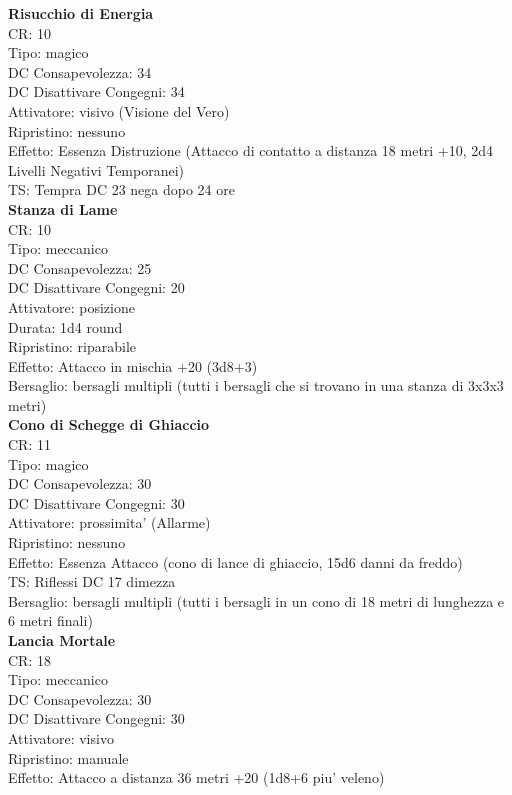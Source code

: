 \documentclass[a4paper,11pt,twoside,openany]{book}
\begin{document}
\begin{multicols}{2}
\textbf{Risucchio di Energia}\\
CR: 10 \\
Tipo: magico \\
DC Consapevolezza: 34 \\
DC Disattivare Congegni: 34 \\
Attivatore: visivo (Visione del Vero) \\
Ripristino: nessuno \\
Effetto: Essenza Distruzione (Attacco di contatto a distanza 18 metri +10, 2d4 Livelli Negativi Temporanei) \\
TS: Tempra DC 23 nega dopo 24 ore\\

\textbf{Stanza di Lame}\\
CR: 10 \\
Tipo: meccanico \\
DC Consapevolezza: 25 \\
DC Disattivare Congegni: 20 \\
Attivatore: posizione \\
Durata: 1d4 round \\
Ripristino: riparabile \\
Effetto: Attacco in mischia +20 (3d8+3) \\
Bersaglio: bersagli multipli (tutti i bersagli che si trovano in una stanza di 3x3x3 metri)\\

\textbf{Cono di Schegge di Ghiaccio}\\
CR: 11 \\
Tipo: magico \\
DC Consapevolezza: 30 \\
DC Disattivare Congegni: 30 \\
Attivatore: prossimita' (Allarme) \\
Ripristino: nessuno \\
Effetto: Essenza Attacco (cono di lance di ghiaccio, 15d6 danni da freddo) \\
TS: Riflessi DC 17 dimezza \\
Bersaglio: bersagli multipli (tutti i bersagli in un cono di 18 metri di lunghezza e 6 metri finali)\\

\textbf{Lancia Mortale}\\
CR: 18 \\
Tipo: meccanico \\
DC Consapevolezza: 30 \\
DC Disattivare Congegni: 30 \\
Attivatore: visivo\\
Ripristino: manuale \\
Effetto: Attacco a distanza 36 metri +20 (1d8+6 piu' veleno)\\


\end{multicols}
\end{document}
